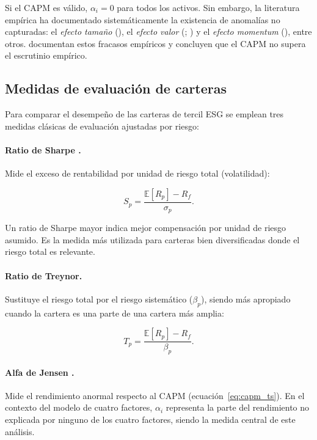 \documentclass[12pt, a4paper]{article}
\begin{document}
Si el CAPM es v\'alido, $\alpha_i = 0$ para todos los activos. Sin embargo, la
literatura emp\'irica ha documentado sistem\'aticamente la existencia de anomal\'ias
no capturadas: el \textit{efecto tama\~no} (\cite{banz1981}), el \textit{efecto valor}
(\cite{rosenberg1985}; \cite{famafrench1992}) y el \textit{efecto momentum}
(\cite{jegadeesh1993}), entre otros. \textcite{famafrench2004} documentan estos fracasos
emp\'iricos y concluyen que el CAPM no supera el escrutinio emp\'irico.

\subsection{Medidas de evaluaci\'on de carteras}
\label{subsec:medidas}

Para comparar el desempe\~no de las carteras de tercil ESG se emplean tres medidas
cl\'asicas de evaluaci\'on ajustadas por riesgo:

\paragraph{Ratio de Sharpe \parencite{sharpe1964}.} Mide el exceso de rentabilidad
por unidad de riesgo total (volatilidad):

\begin{equation}
  \label{eq:sharpe}
  S_p = \frac{\mathbb{E}[R_p] - R_f}{\sigma_p}.
\end{equation}

Un ratio de Sharpe mayor indica mejor compensaci\'on por unidad de riesgo asumido.
Es la medida m\'as utilizada para carteras bien diversificadas donde el riesgo total
es relevante.

\paragraph{Ratio de Treynor.} Sustituye el riesgo total por el riesgo sistem\'atico
($\beta_p$), siendo m\'as apropiado cuando la cartera es una parte de una cartera
m\'as amplia:

\begin{equation}
  \label{eq:treynor}
  T_p = \frac{\mathbb{E}[R_p] - R_f}{\beta_p}.
\end{equation}

\paragraph{Alfa de Jensen \parencite{jensen1968}.} Mide el rendimiento anormal respecto
al CAPM (ecuaci\'on~\ref{eq:capm_ts}). En el contexto del modelo de cuatro factores,
$\alpha_i$ representa la parte del rendimiento no explicada por ninguno de los cuatro
factores, siendo la medida central de este an\'alisis.
\end{document}
